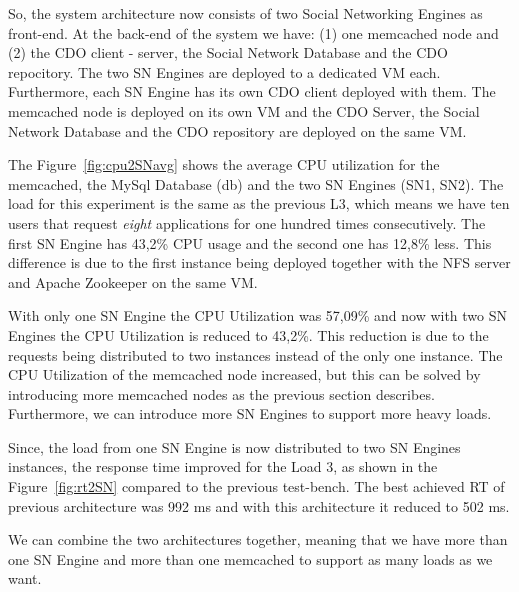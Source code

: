 So, the system architecture now consists of two Social Networking Engines as front-end. At the back-end of the system we have: (1) one memcached node and (2) the CDO client - server, the Social Network Database and the CDO repocitory. The two SN Engines are deployed to a dedicated VM each. Furthermore, each SN Engine has its own CDO client deployed with them. The memcached node is deployed on its own VM and the CDO Server, the Social Network Database and the CDO repository are deployed on the same VM.

The Figure~\ref{fig:cpu2SNavg} shows the average CPU utilization for the memcached, the MySql Database (db) and the two SN Engines (SN1, SN2). The load for this experiment is the same as the previous L3, which means we have ten users that request \emph{eight} applications for one hundred times consecutively. The first SN Engine has 43,2\% CPU usage and the second one has 12,8\% less. This difference is due to the first instance being deployed together with the NFS server and Apache Zookeeper on the same VM. 

With only one SN Engine the CPU Utilization was 57,09\% and now with two SN Engines the CPU Utilization is reduced to 43,2\%. This reduction is due to the requests being distributed to two instances instead of the only one instance. The CPU Utilization of the memcached node increased, but this can be solved by introducing more memcached nodes as the previous section describes. Furthermore, we can introduce more SN Engines to support more heavy loads.

Since, the load from one SN Engine is now distributed to two SN Engines instances, the response time improved for the Load 3, as shown in the Figure~\ref{fig:rt2SN} compared to the previous test-bench. The best achieved RT of previous architecture was 992 ms and with this architecture it reduced to 502 ms.

We can combine the two architectures together, meaning that we have more than one SN Engine and more than one memcached to support as many loads as we want.

